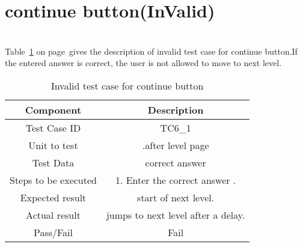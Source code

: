 \section{continue button(InValid)}
\hspace{1cm} \\
Table~\ref{table:tc11} on
page~\pageref{table:tc11}gives the description of  invalid test case for continue button.If the entered answer is correct, the user  is not allowed to move to next level.\\
\vspace{10cm}
\begin{table}[htb!]
\label{table :tc11}
\centering %
\begin{tabular}{c c} %
\hline\hline %
 Component & Description \\ [0.5ex] %
\hline %
Test Case ID & TC6\_1   \\
Unit to test &.after level page \\ 
Test Data &correct answer\\
Steps to be executed &1. Enter the correct answer .\\

Expected result  &start of next level.\\ 
Actual result &jumps to next level after a delay.\\
Pass/Fail &Fail\\


\hline %
\end{tabular}
\caption{Invalid test case for continue button} \label{table:tc11} %
\end{table}
